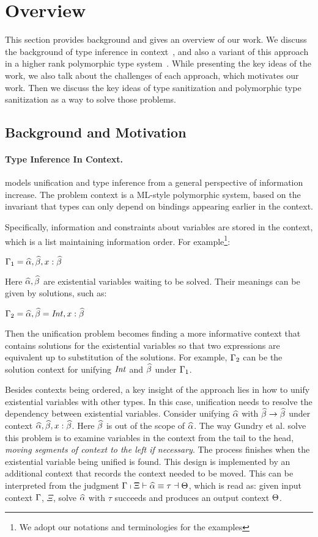 \section{Overview}
\label{sec:overview}

This section provides background and gives an overview of our work.
We discuss the background of type inference in context~\cite{}, and also a
variant of this approach in a higher rank polymorphic type system~\cite{}. While
presenting the key ideas of the work, we also talk about the challenges of each
approach, which motivates our work. Then we discuss the key ideas of
type sanitization and polymorphic type sanitization as a way to solve
those problems.

\subsection{Background and Motivation}

\paragraph{Type Inference In Context.}
\citet{gundry2010type} models unification and type inference from a general
perspective of information increase. The problem context is a ML-style
polymorphic system, based on the invariant that types can only depend on
bindings appearing earlier in the context.

Specifically, information and constraints about variables are stored in the
context, which is a list maintaining information order. For example\footnote{We
  adopt our notations and terminologies for the examples}:

$\Gamma_1 = \widehat{\alpha}, \widehat{\beta}, x :\widehat{\beta}$

Here $\widehat{\alpha}, \widehat{\beta}$ are existential variables waiting to be solved. Their
meanings can be given by solutions, such as:

$\Gamma_2 = \widehat{\alpha}, \widehat{\beta} = \mathit{Int}, x :\widehat{\beta}$

Then the unification problem becomes finding a more informative context that
contains solutions for the existential variables so that two expressions are
equivalent up to substitution of the solutions. For
example, $\Gamma_2$ can be the solution context for unifying
$\mathit{Int}$ and $\widehat{\beta}$ under $\Gamma_1$.

Besides contexts being ordered, a key insight of the approach lies in how to
unify existential variables with other types. In this case, unification needs to
resolve the dependency between existential variables. Consider unifying $\widehat{\alpha}$
with $\widehat{\beta} \to \widehat{\beta}$ under context $\widehat{\alpha}, \widehat{\beta}, x : \widehat{\beta}$. Here $\widehat{\beta}$ is
out of the scope of $\widehat{\alpha}$. The way Gundry et al. solve this problem is to examine variables in
the context from the tail to the head, \textit{moving segments of context to the
  left if necessary}. The process finishes when the existential variable being unified is found.
This design is implemented by an additional context that records the context
needed to be moved. This can be interpreted from the judgment $\Gamma \shortmid
\Xi \vdash \widehat{\alpha} \equiv \tau \dashv \Theta$, which is read as: given input context
$\Gamma$, $\Xi$, solve $\widehat{\alpha}$ with $\tau$ succeeds and produces an output
context $\Theta$.

